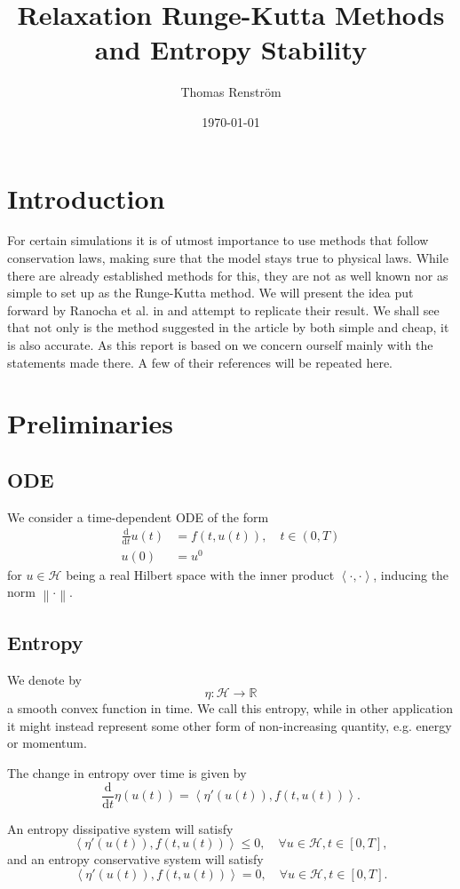 \documentclass{article}
\title{Relaxation Runge-Kutta Methods and Entropy Stability}
\author{Thomas Renström}
\date{\today}
\newcommand{\norm}[1]{\left\lVert#1\right\rVert}
\newcommand{\inner}[2]{\left< #1 , #2 \right>}
\begin{document}
\maketitle
\section{Introduction}

For certain simulations it is of utmost importance to use methods that follow conservation laws, making sure that the model stays true to physical laws. While there are already established methods for this, they are not as well known nor as simple to set up as the Runge-Kutta method. We will present the idea put forward by Ranocha et al. in \cite{Ranocha_2020} and attempt to replicate their result. We shall see that not only is the method suggested in the article by both simple and cheap, it is also accurate.
As this report is based on \cite{Ranocha_2020} we concern ourself mainly with the statements made there. A few of their references will be repeated here.

\section{Preliminaries}
\subsection{ODE}
    We consider a time-dependent ODE of the form
    \begin{align*}
        \frac{\text{d}}{\text{d}t} u(t) &= f(t, u(t)), \quad t \in (0, T)\\
        u(0) &= u^0
    \end{align*}
    for \(u \in \mathcal{H}\) being a real Hilbert space with the inner product \(\inner{\cdot}{\cdot}\), inducing the norm \(\norm{\cdot}\).


\subsection{Entropy}
    We denote by
    \[ \eta: \mathcal{H} \rightarrow \mathbb{R}\]
    a smooth convex function in time.
    We call this entropy, while in other application it might instead represent some other form of non-increasing quantity, e.g. energy or momentum.

    The change in entropy over time is given by
    \[\frac{\text{d}}{\text{d}t} \eta (u(t)) = \inner{\eta'(u(t))}{f(t, u(t))}.\]

    An entropy dissipative system will satisfy
    \begin{equation}\label{Eq_dissipative}
        \inner{\eta'(u(t))}{f(t, u(t))} \leq 0, \quad \forall u \in \mathcal{H}, t \in [0, T],
    \end{equation}
    and an entropy conservative system will satisfy
    \begin{equation}\label{Eq_conservative}
        \inner{\eta'(u(t))}{f(t, u(t))} = 0, \quad \forall u \in \mathcal{H}, t \in [0, T].
    \end{equation}
\end{document}

